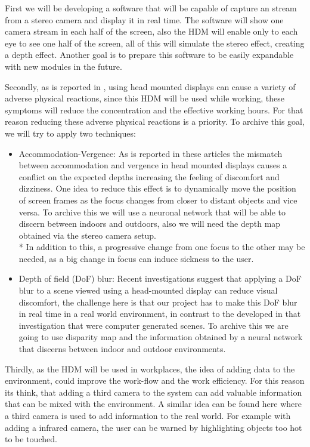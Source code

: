 \documentclass[10pt,a4paper,twocolumn,twoside]{article}
\begin{document}
First we will be developing a software that will be capable of capture an stream from a stereo camera and display it in real time. The software will show one camera stream in each half of the screen, also the HDM will enable only to each eye to see one half of the screen, all of this will simulate the stereo effect, creating a depth effect. Another goal is to prepare this software to be easily expandable with new modules in the future.

Secondly, as is reported in \cite{disconfortReview}, using head mounted displays can cause a variety of adverse physical reactions, since this HDM will be used while working, these symptoms will reduce the concentration and the effective working hours. For that reason reducing these adverse physical reactions is a priority. To archive this goal, we will try to apply two techniques: 

\begin{itemize}
	\item Accommodation-Vergence: As is reported in these \cite{disconfortReview}\cite{vergenceDisconfort} articles the mismatch between accommodation and vergence in head mounted displays causes a conflict on the expected depths increasing the feeling of discomfort and dizziness.  One idea to reduce this effect is to dynamically move the position of screen frames as the focus changes from closer to distant objects and vice versa. To archive this we will use a neuronal network that will be able to discern between indoors and outdoors, also we will need the depth map obtained via the stereo camera setup. \\*
	In addition to this, a progressive change from one focus to the other may be needed, as a big change in focus can induce sickness to the user.
	
	\item Depth of field (DoF) blur: Recent investigations\cite{ifftConfortDoF} suggest that applying a DoF blur to a scene viewed using a head-mounted display can reduce visual discomfort, the challenge here is that our project has to make this DoF blur in real time in a real world environment, in contrast to the developed in that investigation that were computer generated scenes. To archive this we are going to use disparity map and the information obtained by a neural network that discerns between indoor and outdoor environments.
\end{itemize} 

Thirdly, as the HDM will be used in workplaces, the idea of adding data to the environment, could improve the work-flow and the work efficiency. For this reason its think, that adding a third camera to the system can add valuable information that can be mixed with the environment. A similar idea can be found here \cite{vismerge} where a third camera is used to add information to the real world. For example with adding a infrared camera, the user can be warned by highlighting objects too hot to be touched.
\end{document}
